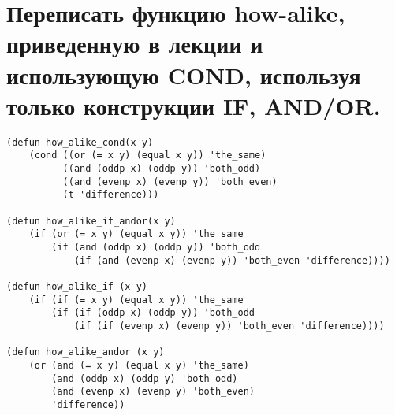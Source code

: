 \section{Переписать функцию how-alike, приведенную в лекции и использующую COND, используя только конструкции IF, AND/OR.}
\begin{lstlisting}[caption=Задание 9]
(defun how_alike_cond(x y)
	(cond ((or (= x y) (equal x y)) 'the_same)
		  ((and (oddp x) (oddp y)) 'both_odd)
		  ((and (evenp x) (evenp y)) 'both_even)
		  (t 'difference)))
		  
(defun how_alike_if_andor(x y)
	(if (or (= x y) (equal x y)) 'the_same
		(if (and (oddp x) (oddp y)) 'both_odd 
			(if (and (evenp x) (evenp y)) 'both_even 'difference))))
	
(defun how_alike_if (x y)
	(if (if (= x y) (equal x y)) 'the_same
		(if (if (oddp x) (oddp y)) 'both_odd
			(if (if (evenp x) (evenp y)) 'both_even 'difference))))
			
(defun how_alike_andor (x y)
	(or (and (= x y) (equal x y) 'the_same) 
		(and (oddp x) (oddp y) 'both_odd)
		(and (evenp x) (evenp y) 'both_even)
		'difference)) 
\end{lstlisting}